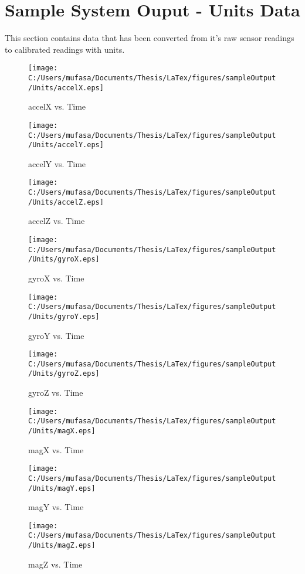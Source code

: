 \section{Sample System Ouput - Units Data}
This section contains data that has been converted from it's raw sensor readings to calibrated readings with units.
\begin{figure}[]
	\centering
	\caption{accelX vs. Time}
		\texttt{[image: C:/Users/mufasa/Documents/Thesis/LaTex/figures/sampleOutput/Units/accelX.eps]}
\end{figure}
\begin{figure}[]
	\centering
	\caption{accelY vs. Time}
		\texttt{[image: C:/Users/mufasa/Documents/Thesis/LaTex/figures/sampleOutput/Units/accelY.eps]}
\end{figure}
\begin{figure}[]
	\centering
	\caption{accelZ vs. Time}
		\texttt{[image: C:/Users/mufasa/Documents/Thesis/LaTex/figures/sampleOutput/Units/accelZ.eps]}
\end{figure}
\begin{figure}[]
	\centering
	\caption{gyroX vs. Time}
		\texttt{[image: C:/Users/mufasa/Documents/Thesis/LaTex/figures/sampleOutput/Units/gyroX.eps]}
\end{figure}
\begin{figure}[]
	\centering
	\caption{gyroY vs. Time}
		\texttt{[image: C:/Users/mufasa/Documents/Thesis/LaTex/figures/sampleOutput/Units/gyroY.eps]}
\end{figure}
\begin{figure}[]
	\centering
	\caption{gyroZ vs. Time}
		\texttt{[image: C:/Users/mufasa/Documents/Thesis/LaTex/figures/sampleOutput/Units/gyroZ.eps]}
\end{figure}
\clearpage
\begin{figure}[]
	\centering
	\caption{magX vs. Time}
		\texttt{[image: C:/Users/mufasa/Documents/Thesis/LaTex/figures/sampleOutput/Units/magX.eps]}
\end{figure}
\begin{figure}[]
	\centering
	\caption{magY vs. Time}
		\texttt{[image: C:/Users/mufasa/Documents/Thesis/LaTex/figures/sampleOutput/Units/magY.eps]}
\end{figure}
\begin{figure}[]
	\centering
	\caption{magZ vs. Time}
		\texttt{[image: C:/Users/mufasa/Documents/Thesis/LaTex/figures/sampleOutput/Units/magZ.eps]}
\end{figure}
